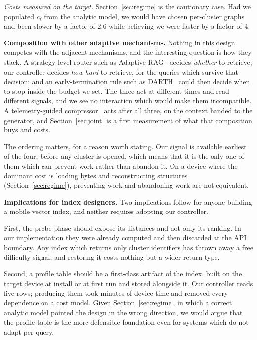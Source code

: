 \documentclass[journal]{IEEEtran}
\begin{document}
\emph{Costs measured on the target.} Section~\ref{sec:regime} is the
cautionary case. Had we populated $c_\ell$ from the analytic model, we
would have chosen per-cluster graphs and been slower by a factor of $2.6$
while believing we were faster by a factor of $4$.

\textbf{Composition with other adaptive mechanisms.} Nothing in this design
competes with the adjacent mechanisms, and the interesting question is how
they stack. A strategy-level router such as
Adaptive-RAG~\cite{jeong2024adaptiverag} decides \emph{whether} to
retrieve; our controller decides \emph{how hard} to retrieve, for the
queries which survive that decision; and an early-termination rule such as
DARTH~\cite{chatzakis2026darth} could then decide when to stop inside the
budget we set. The three act at different times and read different signals,
and we see no interaction which would make them incompatible. A
telemetry-guided compressor~\cite{feric2026adaptivecompression} acts after
all three, on the context handed to the generator, and
Section~\ref{sec:joint} is a first measurement of what that composition
buys and costs.

The ordering matters, for a reason worth stating. Our signal is available
earliest of the four, before any cluster is opened, which means that it is
the only one of them which can prevent work rather than abandon it. On a
device where the dominant cost is loading bytes and reconstructing
structures (Section~\ref{sec:regime}), preventing work and abandoning work
are not equivalent.

\textbf{Implications for index designers.} Two implications follow for
anyone building a mobile vector index, and neither requires adopting our
controller.

First, the probe phase should expose its distances and not only its
ranking. In our implementation they were already computed and then
discarded at the API boundary. Any index which returns only cluster
identifiers has thrown away a free difficulty signal, and restoring it
costs nothing but a wider return type.

Second, a profile table should be a first-class artifact of the index,
built on the target device at install or at first run and stored alongside
it. Our controller reads five rows; producing them took minutes of device
time and removed every dependence on a cost model. Given
Section~\ref{sec:regime}, in which a correct analytic model pointed the
design in the wrong direction, we would argue that the profile table is the
more defensible foundation even for systems which do not adapt per query.
\end{document}
